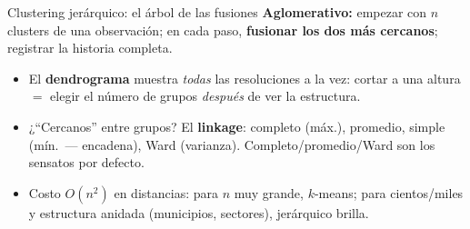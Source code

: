 \documentclass{beamer}
\newcommand{\1}{\mathbb{I}}
\begin{document}
\begin{frame}{Clustering jerárquico: el árbol de las fusiones}
\small
\textbf{Aglomerativo:} empezar con $n$ clusters de una observación; en cada paso, \textbf{fusionar los dos más cercanos}; registrar la historia completa.

\vspace{0.15cm}
\begin{center}
\end{center}
\pause

\begin{itemize}\itemsep4pt
  \item El \textbf{dendrograma} muestra \emph{todas} las resoluciones a la vez: cortar a una altura $=$ elegir el número de grupos \emph{después} de ver la estructura.
  \item ¿``Cercanos'' entre grupos? El \textbf{linkage}: completo (máx.), promedio, simple (mín.\ --- encadena), Ward (varianza). Completo/promedio/Ward son los sensatos por defecto.
  \item Costo $O(n^2)$ en distancias: para $n$ muy grande, $k$-means; para cientos/miles y estructura anidada (municipios, sectores), jerárquico brilla.
\end{itemize}
\end{frame}
\end{document}
